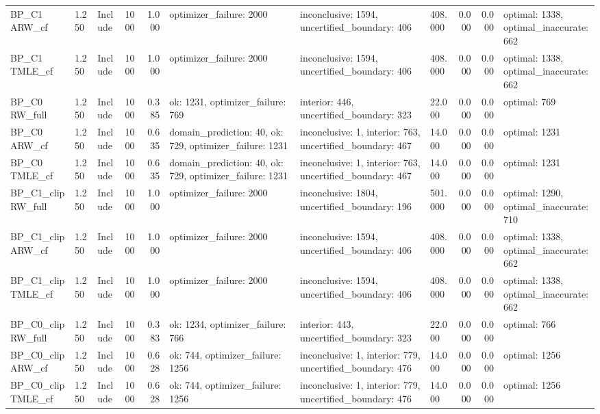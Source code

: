 \begin{tabular}{llllrlllrrl}
BP\_C1 ARW\_cf & 1.250 & Include & 1000 & 1.000 & optimizer\_failure: 2000 & inconclusive: 1594, uncertified\_boundary: 406 & 408.000 & 0.000 & 0.000 & optimal: 1338, optimal\_inaccurate: 662 \\
BP\_C1 TMLE\_cf & 1.250 & Include & 1000 & 1.000 & optimizer\_failure: 2000 & inconclusive: 1594, uncertified\_boundary: 406 & 408.000 & 0.000 & 0.000 & optimal: 1338, optimal\_inaccurate: 662 \\
BP\_C0 RW\_full & 1.250 & Include & 1000 & 0.385 & ok: 1231, optimizer\_failure: 769 & interior: 446, uncertified\_boundary: 323 & 22.000 & 0.000 & 0.000 & optimal: 769 \\
BP\_C0 ARW\_cf & 1.250 & Include & 1000 & 0.635 & domain\_prediction: 40, ok: 729, optimizer\_failure: 1231 & inconclusive: 1, interior: 763, uncertified\_boundary: 467 & 14.000 & 0.000 & 0.000 & optimal: 1231 \\
BP\_C0 TMLE\_cf & 1.250 & Include & 1000 & 0.635 & domain\_prediction: 40, ok: 729, optimizer\_failure: 1231 & inconclusive: 1, interior: 763, uncertified\_boundary: 467 & 14.000 & 0.000 & 0.000 & optimal: 1231 \\
BP\_C1\_clip RW\_full & 1.250 & Include & 1000 & 1.000 & optimizer\_failure: 2000 & inconclusive: 1804, uncertified\_boundary: 196 & 501.000 & 0.000 & 0.000 & optimal: 1290, optimal\_inaccurate: 710 \\
BP\_C1\_clip ARW\_cf & 1.250 & Include & 1000 & 1.000 & optimizer\_failure: 2000 & inconclusive: 1594, uncertified\_boundary: 406 & 408.000 & 0.000 & 0.000 & optimal: 1338, optimal\_inaccurate: 662 \\
BP\_C1\_clip TMLE\_cf & 1.250 & Include & 1000 & 1.000 & optimizer\_failure: 2000 & inconclusive: 1594, uncertified\_boundary: 406 & 408.000 & 0.000 & 0.000 & optimal: 1338, optimal\_inaccurate: 662 \\
BP\_C0\_clip RW\_full & 1.250 & Include & 1000 & 0.383 & ok: 1234, optimizer\_failure: 766 & interior: 443, uncertified\_boundary: 323 & 22.000 & 0.000 & 0.000 & optimal: 766 \\
BP\_C0\_clip ARW\_cf & 1.250 & Include & 1000 & 0.628 & ok: 744, optimizer\_failure: 1256 & inconclusive: 1, interior: 779, uncertified\_boundary: 476 & 14.000 & 0.000 & 0.000 & optimal: 1256 \\
BP\_C0\_clip TMLE\_cf & 1.250 & Include & 1000 & 0.628 & ok: 744, optimizer\_failure: 1256 & inconclusive: 1, interior: 779, uncertified\_boundary: 476 & 14.000 & 0.000 & 0.000 & optimal: 1256 \\

\end{tabular}

